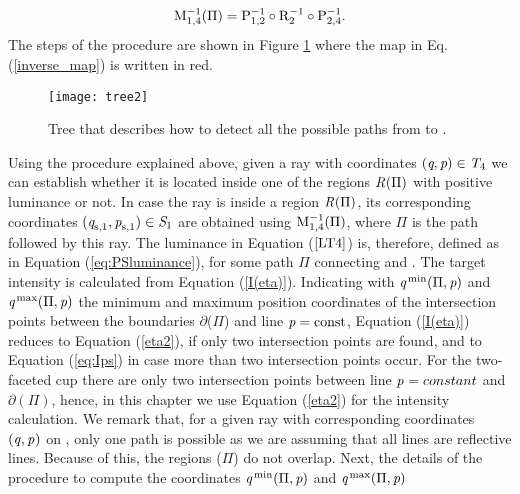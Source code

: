 \begin{equation}
\label{inverse_map}
\mathrm{M}_{{1,4}}^{-1}({\Pi}) = \mathrm{P}_{{1,2}}^{-1}
\circ \mathrm{R}_{{2}}^{-1}\circ \mathrm{P}_{{2,4}}^{-1}.
\end{equation}
The steps of the procedure are shown in Figure \ref{fig:tree} where the map in Eq. (\ref{inverse_map}) is written in red. \\
\begin{figure}
 \begin{center}
  \texttt{[image: tree2]}
\label{fig:tree}
  \end{center}
\caption{Tree that describes how to detect all the possible paths from  to .}
\label{fig:tree}
\end{figure}
Using the procedure explained above, given a ray with coordinates
$(\textit{q}, \textit{p})\in \mbox{$\emph{T}_{\textit{$4$}}$}$ we can establish whether it is located inside one of the regions $\mbox{$\emph{R}_{\textit{}}$}(\Pi)$ with positive luminance or not.
In case the ray is inside a region $\mbox{$\emph{R}_{\textit{}}$}(\Pi)$,
its corresponding coordinates $(\textit{q}_{\textrm{s,} \textit{$1$}},\textit{p}_{\textrm{s,} \textit{$1$}})\in \mbox{$\emph{S}_{\textit{$1$}}$}$ are obtained using $\mathrm{M}_{{1,4}}^{-1}(\Pi)$, where $\Pi$ is the path followed by this ray. The luminance in Equation ($\ref{LT4}$) is, therefore, defined as in Equation (\ref{eq:PSluminance}), 
for some path $\Pi$ connecting  and . The target intensity is calculated from Equation (\ref{I(eta)}). 
Indicating with $\textit{q}^\textrm{\,min}(\Pi,\textit{p})$ and $\textit{q}^\textrm{\,max}(\Pi,\textit{p})$ the minimum and maximum position coordinates of the intersection points between the boundaries $ \partial$($\Pi$) and line $\textit{p}= \mbox{const}$,
Equation (\ref{I(eta)}) reduces to Equation (\ref{eta2}), if only two intersection points are found, and to Equation (\ref{eq:Ips}) in case more than two intersection points occur. For the two-faceted cup there are only two intersection points between line $\textit{p}_{\textrm{} \textit{}}{}=constant$ and $\partial$$(\Pi)$, hence, in this chapter we use Equation (\ref{eta2}) for the intensity calculation.
We remark that, for a given ray with corresponding coordinates $(\textit{q}_{\textrm{} \textit{}}, \textit{p}_{\textrm{} \textit{}})$ on , only one path is possible as we are assuming that all lines are reflective lines.
Because of this, the regions ($\Pi$) do not overlap.
Next, the details of the procedure to compute the coordinates $\textit{q}^\textrm{\,min}(\Pi, \textit{p})$ and $\textit{q}^\textrm{\,max}(\Pi, \textit{p})$
